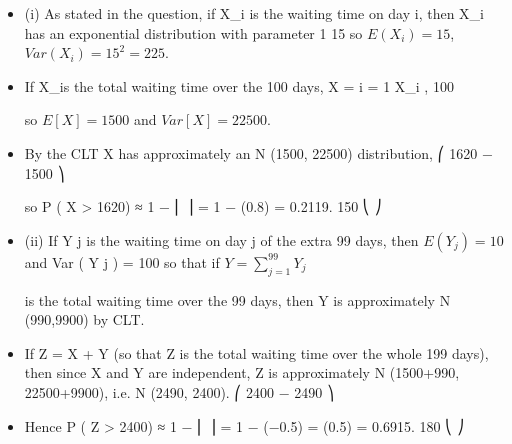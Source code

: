 \documentclass[a4paper,12pt]{article}
\begin{document}
\begin{itemize}
\item (i)
As stated in the question, if X_{i} is the waiting time on day i, then X_{i} has an
exponential distribution with parameter
1
15
so $E(X_{i} ) = 15$, $Var(X_{i} ) = 15^2 = 225$.
\item If X_{i}s the total waiting time over the 100 days, X = \sum i = 1 X_{i} ,
100


so $E [ X ] = 1500$ and $Var [ X ] = 22500$. 
\item  By the CLT
X has approximately an N (1500, 22500) distribution,
⎛ 1620 − 1500 ⎞

so P ( X > 1620) ≈ 1 − \Phi ⎜
⎟ = 1 − \Phi(0.8) = 0.2119.
150
⎝
⎠
\item (ii)
If Y j is the waiting time on day j of the extra 99 days, then $E ( Y_j ) = 10$ and
Var ( Y j ) = 100 so that if $Y =
\sum^{99}_{j = 1} Y_j$

is the total waiting time over the 99 days,
then Y is approximately N (990,9900) by CLT.
\item If Z = X + Y (so that Z is the total waiting time over the whole 199 days), then
since X and Y are independent, Z is approximately N (1500+990, 22500+9900),
i.e. N (2490, 2400).
⎛ 2400 − 2490 ⎞
\item Hence P ( Z > 2400) ≈ 1 − \Phi ⎜
⎟ = 1 − \Phi(−0.5) = \Phi(0.5) = 0.6915.
180
⎝
⎠
\end{itemize}
\end{document}
